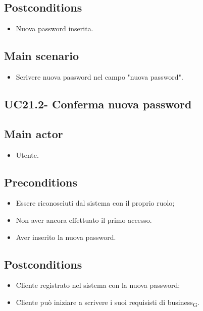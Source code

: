 \documentclass{article}
\begin{document}
    \subsection*{Postconditions}
        \begin{itemize}
            \item Nuova password inserita.
        \end{itemize}

        \subsection*{Main scenario}
        \begin{itemize}
            \item Scrivere nuova password nel campo "nuova password".
        \end{itemize}

    \subsection{UC21.2- Conferma nuova password}
    \subsection*{Main actor}
        \begin{itemize}
            \item Utente.
        \end{itemize}
        
    \subsection*{Preconditions}
        \begin{itemize}
            \item Essere riconosciuti dal sistema con il proprio ruolo;
            \item Non aver ancora effettuato il primo accesso.
            \item Aver inserito la nuova password.
        \end{itemize}
        
    \subsection*{Postconditions}
        \begin{itemize}
            \item Cliente registrato nel sistema con la nuova password;
            \item Cliente può iniziare a scrivere i suoi requisisti di business\textsubscript{G}.
        \end{itemize}
\end{document}

